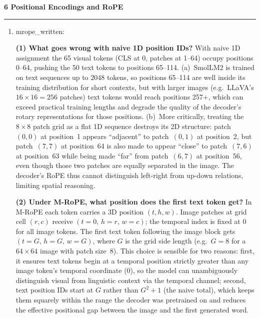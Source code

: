 \documentclass[11pt]{article}
\newenvironment{question}[1]
    {
        \begin{center}
        \textbf{#1} \rmfamily
        \bigskip
        \hrule
    }
    {
        \end{center}
    }
\begin{document}
\begin{question}{6 Positional Encodings and RoPE}
\begin{enumerate}[label=\textbf{\arabic*.}]
    2D RoPE achieves the highest train-size accuracy (92.70\%) and the best
    extrapolation accuracy (81.68\%), in line with both predictions.
    The advantage at train size is modest ($<$\,0.5 pp over learned PE) but
    consistent with the 2D positional bias matching EuroSAT's spatially
    structured imagery.
    At extrapolation, 2D RoPE surpasses learned PE (81.37\%) by 0.3 pp and
    outperforms 1D RoPE (79.46\%) by 2.2 pp, confirming that encoding
    row and column positions independently generalises better to a larger grid
    than flattening patches into a 1D sequence.
    All three methods experience a roughly 10--13 pp accuracy drop moving from
    $64\times64$ to $96\times96$, suggesting the dominant cost is distributional
    shift (more patches, different receptive field) rather than the specific
    positional encoding.

    \item mrope\_written:

    \textbf{(1) What goes wrong with naive 1D position IDs?}
    With naive 1D assignment the 65 visual tokens (CLS at 0, patches at
    1--64) occupy positions 0--64, pushing the 50 text tokens to positions
    65--114.
    (a)~SmolLM2 is trained on text sequences up to 2048 tokens, so positions
    65--114 are well inside its training distribution for short contexts, but
    with larger images (e.g.\ LLaVA's $16\times16=256$ patches) text tokens
    would reach positions 257+, which can exceed practical training lengths and
    degrade the quality of the decoder's rotary representations for those
    positions.
    (b)~More critically, treating the $8\times8$ patch grid as a flat 1D
    sequence destroys its 2D structure: patch~$(0,0)$ at position~1 appears
    ``adjacent'' to patch~$(0,1)$ at position~2, but patch~$(7,7)$ at
    position~64 is also made to appear ``close'' to patch~$(7,6)$ at
    position~63 while being made ``far'' from patch~$(6,7)$ at position~56,
    even though those two patches are equally separated in the image.
    The decoder's RoPE thus cannot distinguish left-right from up-down
    relations, limiting spatial reasoning.

    \textbf{(2) Under M-RoPE, what position does the first text token get?}
    In M-RoPE each token carries a 3D position $(t, h, w)$.
    Image patches at grid cell $(r, c)$ receive $(t=0,\, h=r,\, w=c)$; the
    temporal index is fixed at 0 for all image tokens.
    The first text token following the image block gets
    $(t=G,\, h=G,\, w=G)$, where $G$ is the grid side length (e.g.\ $G=8$
    for a $64\times64$ image with patch size~8).
    This choice is sensible for two reasons: first, it ensures text tokens
    begin at a temporal position strictly greater than any image token's
    temporal coordinate (0), so the model can unambiguously distinguish visual
    from linguistic context via the temporal channel; second, text position IDs
    start at $G$ rather than $G^2+1$ (the naive total), which keeps them
    squarely within the range the decoder was pretrained on and reduces the
    effective positional gap between the image and the first generated word.


\end{enumerate}
\end{question}
\end{document}
